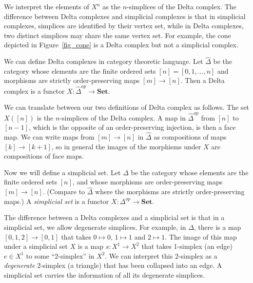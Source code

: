 \documentclass[a4paper,11pt,leqno]{article}
\theoremstyle{definition}
\begin{document}
We interpret the elements of $X^n$ as the $n$-simplices of the Delta complex.
The difference between Delta complexes and simplicial complexes is that in simplicial complexes, simplices are identified by their vertex set, while in Delta complexes, two distinct simplices may share the same vertex set.
For example, the cone depicted in Figure~\ref{fig_cone} is a Delta complex but not a simplicial complex.

We can define Delta complexes in category theoretic language.
Let $\hat{\Delta}$ be the category whose elements are the finite ordered sets $[n] = [0,1,\ldots, n]$ and morphisms are strictly order-preserving maps $[m]\to [n]$.
Then a Delta complex is a functor $X: \hat{\Delta}^{op}\to \textbf{Set}$.

We can translate between our two definitions of Delta complex as follows.
The set $X([n])$ is the $n$-simplices of the Delta complex.
A map in $\hat{\Delta}^{op}$ from $[n]$ to $[n-1]$, which is the opposite of an order-preserving injection, is then a face map.
We can write maps from $[m]\to [n]$ in $\hat{\Delta}$ as compositions of maps $[k]\to [k+1]$, so in general the images of the morphisms under $X$ are compositions of face maps.

Now we will define a simplicial set.
Let $\Delta$ be the category whose elements are the finite ordered sets $[n]$, and whose morphisms are order-preserving maps $[m]\to [n]$.
(Compare to $\hat{\Delta}$ where the morphisms are strictly order-preserving maps.)
A \emph{simplicial set} is a functor $X: \Delta^{op}\to \textbf{Set}$.

The difference between a Delta complexes and a simplicial set is that in a simplicial set, we allow degenerate simplices.
For example, in $\Delta$, there is a map $[0, 1, 2]\to [0, 1]$ that takes $0\mapsto 0$, $1\mapsto 1$ and $2\mapsto 1$.
The image of this map under a simplicial set $X$ is a map $s: X^1\to X^2$ that takes 1-simplex (an edge) $e\in X^1$ to some ``2-simplex'' in $X^2$.
We can interpret this 2-simplex as a \emph{degenerate} 2-simplex (a triangle) that has been collapsed into an edge.
A simplicial set carries the information of all its degenerate simplices.
\end{document}
